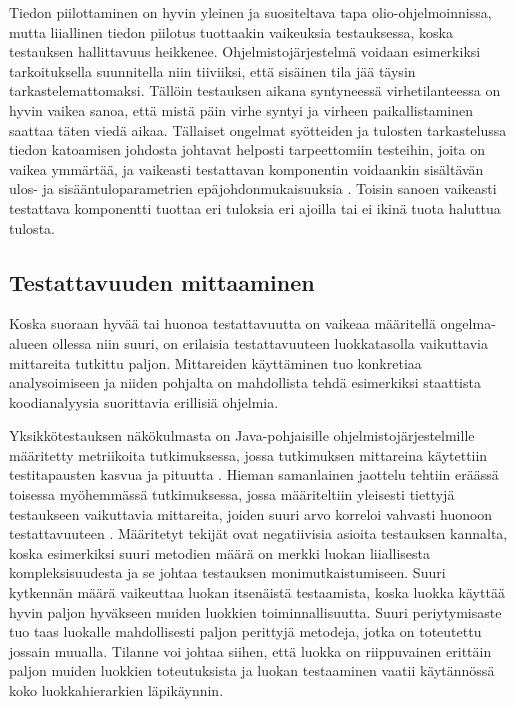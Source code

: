 \documentclass[finnish]{tktltiki2}
\numberwithin{table}{section}
\theoremstyle{definition}
\theoremstyle{remark}
\begin{document}
Tiedon piilottaminen on  hyvin yleinen ja suositeltava tapa olio-ohjelmoinnissa, mutta liiallinen tiedon piilotus tuottaakin vaikeuksia testauksessa, koska testauksen hallittavuus heikkenee. Ohjelmistojärjestelmä voidaan esimerkiksi tarkoituksella suunnitella niin tiiviiksi, että sisäinen tila jää täysin tarkastelemattomaksi. Tällöin testauksen aikana syntyneessä virhetilanteessa on hyvin vaikea sanoa, että mistä päin virhe syntyi ja virheen paikallistaminen saattaa täten viedä aikaa. Tällaiset ongelmat syötteiden ja tulosten tarkastelussa tiedon katoamisen johdosta johtavat helposti tarpeettomiin testeihin, joita on vaikea ymmärtää, ja vaikeasti testattavan komponentin voidaankin sisältävän ulos- ja sisääntuloparametrien epäjohdonmukaisuuksia \citep{Voas:1995:STN:624607.625469}. Toisin sanoen vaikeasti testattava komponentti tuottaa eri tuloksia eri ajoilla tai ei ikinä tuota haluttua tulosta.   




\subsection{Testattavuuden mittaaminen} \label{testability_measure}


Koska suoraan hyvää tai huonoa testattavuutta on vaikeaa määritellä ongelma-alueen ollessa niin suuri, on erilaisia testattavuuteen luokkatasolla vaikuttavia mittareita tutkittu paljon. Mittareiden käyttäminen tuo konkretiaa analysoimiseen ja niiden pohjalta on mahdollista tehdä esimerkiksi staattista koodianalyysia suorittavia erillisiä ohjelmia. 

Yksikkötestauksen näkökulmasta on Java-pohjaisille ohjelmistojärjestelmille määritetty metriikoita tutkimuksessa, jossa tutkimuksen mittareina käytettiin testitapausten kasvua ja pituutta \citep{Bruntink:2004}. Hieman samanlainen jaottelu tehtiin eräässä toisessa myöhemmässä tutkimuksessa, jossa määriteltiin yleisesti tiettyjä testaukseen vaikuttavia mittareita, joiden suuri arvo korreloi vahvasti huonoon testattavuuteen \citep{Dubey:2011:AMM:2020976.2020983}. Määritetyt tekijät ovat negatiivisia asioita testauksen kannalta, koska esimerkiksi suuri metodien määrä on merkki luokan liiallisesta kompleksisuudesta ja se johtaa testauksen monimutkaistumiseen. Suuri kytkennän määrä vaikeuttaa luokan itsenäistä testaamista, koska luokka käyttää hyvin paljon hyväkseen muiden luokkien toiminnallisuutta. Suuri periytymisaste tuo taas luokalle mahdollisesti paljon perittyjä metodeja, jotka on toteutettu jossain muualla. Tilanne voi johtaa siihen, että luokka on riippuvainen erittäin paljon muiden luokkien toteutuksista ja luokan testaaminen vaatii käytännössä koko luokkahierarkien läpikäynnin. 
\end{document}
